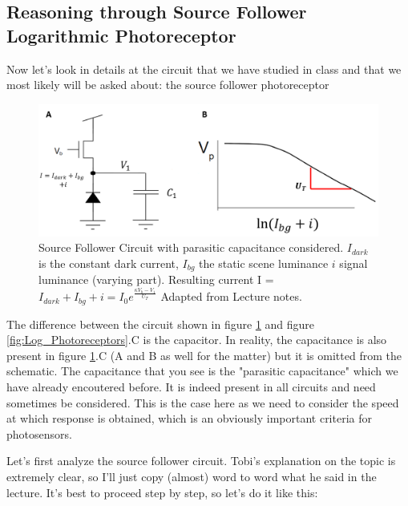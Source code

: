 \subsection{Reasoning through Source Follower Logarithmic Photoreceptor}

Now let's look in details at the circuit that we have studied in class and that we most likely will be asked about: the source follower photoreceptor 

\begin{figure}[H]
    \centering
    \includegraphics[width=0.8\linewidth]{../../Figures/Souce_Follower_Photoreceptor.PNG}
    \caption{Source Follower Circuit with parasitic capacitance considered. $I_{dark}$ is the constant dark current, $I_{bg}$ the static scene luminance $i$ signal luminance (varying part). Resulting current I = $I_{dark} + I_{bg} + i = I_0e^{\frac{\kappa V_b - V_1}{U_T}}$ Adapted from Lecture notes.}
    \label{fig:Souce_Follower_Photoreceptor}
\end{figure}

The difference between the circuit shown in figure \ref{fig:Souce_Follower_Photoreceptor} and  figure \ref{fig:Log_Photoreceptors}.C is the capacitor. In reality, the capacitance is also present in figure \ref{fig:Souce_Follower_Photoreceptor}.C (A and B as well for the matter) but it is omitted from the schematic. The capacitance that you see is the "parasitic capacitance" which we have already encoutered before. It is indeed present in all circuits and need sometimes be considered. This is the case here as we need to consider the speed at which response is obtained, which is an obviously important criteria for photosensors. 

Let's first analyze the source follower circuit. Tobi's explanation on the topic is extremely clear, so I'll just copy (almost) word to word what he said in the lecture. It's best to proceed step by step, so let's do it like this: 

